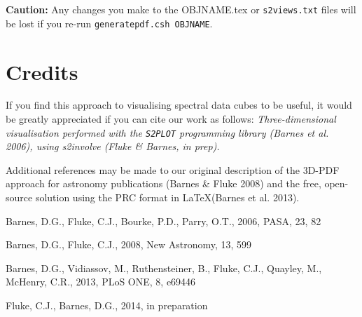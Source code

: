 \documentclass{article}
\begin{document}
{\bf Caution:} Any changes you make to the OBJNAME.tex or {\tt s2views.txt} 
files will be lost if you re-run {\tt generatepdf.csh OBJNAME}.


\section*{Credits}
If you find this approach to visualising spectral data cubes to be useful, 
it would be greatly appreciated if you can cite our work as follows:
{\em Three-dimensional visualisation performed with the {\tt S2PLOT} programming 
library (Barnes et al. 2006), using {\sc s2involve} (Fluke \& Barnes, {\em in prep}).}

Additional references may be made to our original description of the 3D-PDF approach
for astronomy publications (Barnes \& Fluke 2008) and the free, open-source solution 
using the PRC format in \LaTeX (Barnes et al. 2013). 


\begin{thebibliography}{99}
Barnes, D.G., Fluke, C.J., Bourke, P.D., Parry, O.T., 2006, PASA, 23, 82

Barnes, D.G., Fluke, C.J., 2008, New Astronomy, 13, 599 

Barnes, D.G., Vidiassov, M., Ruthensteiner, B., Fluke, C.J., Quayley, M., McHenry, C.R., 2013, PLoS ONE, 8, e69446

Fluke, C.J., Barnes, D.G., 2014, in preparation

\end{thebibliography}
\end{document}
